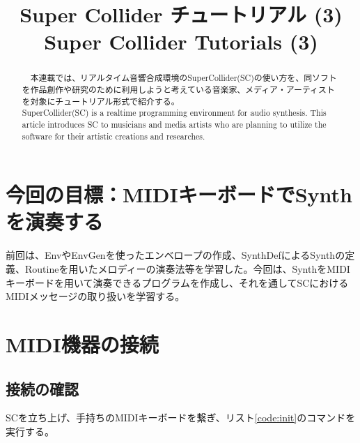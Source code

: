 \documentclass{jsarticle}
\title{Super Collider チュートリアル (3)\\ 
Super Collider Tutorials (3)
}
\begin{document}
\makeatletter 
\def\ps@myheadings{%
\let\ps@jpl@in\ps@plain%
\def\@evenhead{\reset@font\hfil\leftmark\hfil}%
\def\@oddhead{\reset@font\hfil\rightmark\hfil}%
\let\@mkboth\@gobbletwo%
\let\sectionmark\@gobble%
\let\subsectionmark\@gobble%
% 
\def\@oddfoot{\reset@font\hfil-- \thepage --\hfil}%
\let\@evenfoot\@oddfoot 
} 
\makeatother 


\setcounter{page}{ 9 } 
\pagestyle{myheadings} 




\maketitle
\thispagestyle{myheadings}

%
\begin{abstract}
　本連載では、リアルタイム音響合成環境のSuperCollider(SC)の使い方を、同ソフトを作品創作や研究のために利用しようと考えている音楽家、メディア・アーティストを対象にチュートリアル形式で紹介する。\\
SuperCollider(SC) is a realtime programming environment for audio synthesis. This article introduces SC to musicians and media artists who are planning to utilize the software for their artistic creations and researches.
\end{abstract}
%

\section{今回の目標：MIDIキーボードでSynthを演奏する}
前回は、EnvやEnvGenを使ったエンベロープの作成、SynthDefによるSynthの定義、Routineを用いたメロディーの演奏法等を学習した。今回は、SynthをMIDIキーボードを用いて演奏できるプログラムを作成し、それを通してSCにおけるMIDIメッセージの取り扱いを学習する。

\section{MIDI機器の接続}
\subsection{接続の確認}
SCを立ち上げ、手持ちのMIDIキーボードを繋ぎ、リスト\ref{code:init}のコマンドを実行する。
\end{document}
